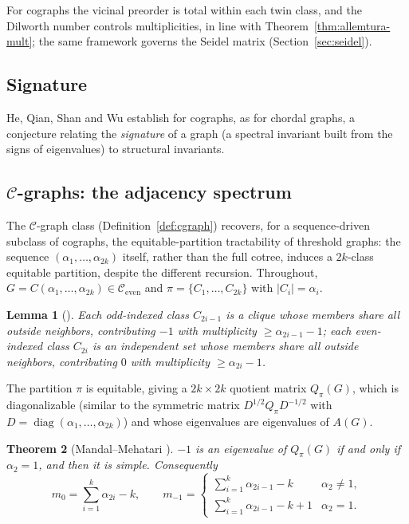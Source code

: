\documentclass[11pt]{article}
\theoremstyle{plain}
\newtheorem{theorem}{Theorem}[section]
\newtheorem{lemma}[theorem]{Lemma}
\theoremstyle{definition}
\theoremstyle{remark}
\DeclareMathOperator{\diag}{diag}
\begin{document}
	For cographs the vicinal preorder is total within each twin class, and the Dilworth number controls multiplicities, in line with Theorem~\ref{thm:allemtura-mult}; the same framework governs the Seidel matrix (Section~\ref{sec:seidel}).
	
	\subsection{Signature}
	
	He, Qian, Shan and Wu \cite{HeQianShanWu2021} establish for cographs, as for chordal graphs, a conjecture relating the \emph{signature} of a graph (a spectral invariant built from the signs of eigenvalues) to structural invariants.
	
	\subsection{\texorpdfstring{$\mathcal{C}$}{C}-graphs: the adjacency spectrum}
	\label{sec:cgraph-adjacency}
	\label{sec:cgraphs}
	
	The $\mathcal{C}$-graph class (Definition~\ref{def:cgraph}) recovers, for a sequence-driven subclass of cographs, the equitable-partition tractability of threshold graphs: the sequence $(\alpha_1,\ldots,\alpha_{2k})$ itself, rather than the full cotree, induces a $2k$-class equitable partition, despite the different recursion. Throughout, $G=C(\alpha_1,\ldots,\alpha_{2k})\in\mathcal{C}_{\mathrm{even}}$ and $\pi=\{C_1,\ldots,C_{2k}\}$ with $|C_i|=\alpha_i$.
	
	\begin{lemma}[\cite{MandalMehatari2025}]
		Each odd-indexed class $C_{2i-1}$ is a clique whose members share all outside neighbors, contributing $-1$ with multiplicity $\ge\alpha_{2i-1}-1$; each even-indexed class $C_{2i}$ is an independent set whose members share all outside neighbors, contributing $0$ with multiplicity $\ge\alpha_{2i}-1$.
	\end{lemma}
	
	The partition $\pi$ is equitable, giving a $2k\times2k$ quotient matrix $Q_\pi(G)$, which is diagonalizable (similar to the symmetric matrix $D^{1/2}Q_\pi D^{-1/2}$ with $D=\diag(\alpha_1,\ldots,\alpha_{2k})$) and whose eigenvalues are eigenvalues of $A(G)$.
	
	\begin{theorem}[Mandal--Mehatari \cite{MandalMehatari2025}]
		\label{thm:cgraph-minus1}
		$-1$ is an eigenvalue of $Q_\pi(G)$ if and only if $\alpha_2=1$, and then it is simple. Consequently
		\[
		m_0=\sum_{i=1}^k\alpha_{2i}-k,\qquad m_{-1}=\begin{cases}\sum_{i=1}^k\alpha_{2i-1}-k&\alpha_2\neq1,\\ \sum_{i=1}^k\alpha_{2i-1}-k+1&\alpha_2=1.\end{cases}
		\]
	\end{theorem}
	
\end{document}
